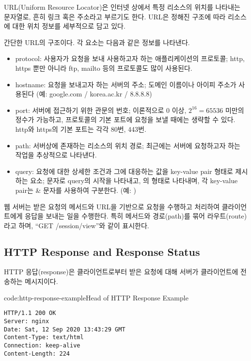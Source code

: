 URL(Uniform Resource Locator)은 인터넷 상에서 특정 리소스의 위치를 나타내는 문자열로, 흔히 링크 혹은 주소라고 부르기도 한다. URL은 정해진 구조에 따라 리소스에 대한 위치 정보를 세부적으로 담고 있다.

    {}

\는 간단한 URL의 구조이다. 각 요소는 다음과 같은 정보를 나타낸다.

\begin{itemize}
    \item protocol: 사용자가 요청을 보내 사용하고자 하는 애플리케이션의 프로토콜; http, https 뿐만 아니라 ftp, mailto 등의 프로토콜도 많이 사용된다.
    \item hostname: 요청을 보내고자 하는 서버의 주소; 도메인 이름이나 아이피 주소가 사용된다 (예: google.com / korea.ac.kr / 8.8.8.8)
    \item port: 서버에 접근하기 위한 관문의 번호; 이론적으로 0 이상, $2^{16}=65536$ 미만의 정수가 가능하고, 프로토콜의 기본 포트에 요청을 보낼 때에는 생략할 수 있다. http와 https의 기본 포트는 각각 80번, 443번.
    \item path: 서버상에 존재하는 리소스의 위치 경로; 최근에는 서버에 요청하고자 하는 작업을 추상적으로 나타낸다.
    \item query: 요청에 대한 상세한 조건과 그에 대응하는 값을 key-value pair 형태로 제시하는 요소;  문자로 query의 시작을 나타내고, 의 형태로 나타내며, 각 key-value pair는 \cd\& 문자를 사용하여 구분한다. (예: )
\end{itemize}

웹 서버는 받은 요청의 메서드와 URL을 기반으로 요청을 수행하고 처리하여 클라이언트에게 응답을 보내는 일을 수행한다. 특히 메서드와 경로(path)를 묶어 라우트(route)라고 하며, ``GET /session/view''와 같이 표시한다.

\subsection*{HTTP Response and Response Status}
HTTP 응답(response)은 클라이언트로부터 받은 요청에 대해 서버가 클라이언트에 전송하는 메시지이다.

\begin{code}{code:http-response-example}{Head of HTTP Response Example}
\begin{verbatim}
HTTP/1.1 200 OK
Server: nginx
Date: Sat, 12 Sep 2020 13:43:29 GMT
Content-Type: text/html
Connection: keep-alive
Content-Length: 224
\end{verbatim}
\end{code}

